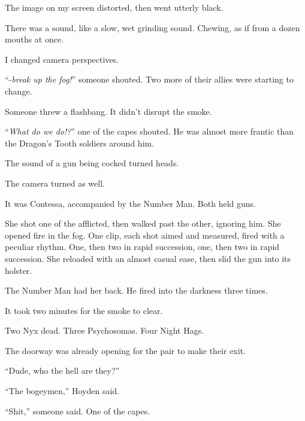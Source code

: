 The image on my screen distorted, then went utterly black.



There was a sound, like a slow, wet grinding sound.  Chewing, as if from a dozen mouths at once.



I changed camera perspectives.



``-\emph{break up the fog!}''  someone shouted.  Two more of their allies were starting to change.



Someone threw a flashbang.  It didn't disrupt the smoke.



``\emph{What do we do!?}'' one of the capes shouted.  He was almost more frantic than the Dragon's Tooth soldiers around him.



The sound of a gun being cocked turned heads.



The camera turned as well.



It was Contessa, accompanied by the Number Man.  Both held guns.



She shot one of the afflicted, then walked past the other, ignoring him.  She opened fire in the fog.  One clip, each shot aimed and measured, fired with a peculiar rhythm.  One, then two in rapid succession, one, then two in rapid succession.  She reloaded with an almost casual ease, then slid the gun into its holster.



The Number Man had her back.  He fired into the darkness three times.



It took two minutes for the smoke to clear.



Two Nyx dead.  Three Psychosomas.  Four Night Hags.



The doorway was already opening for the pair to make their exit.



``Dude, who the hell are they?''



``The bogeymen,'' Hoyden said.



``Shit,'' someone said.  One of the capes.



